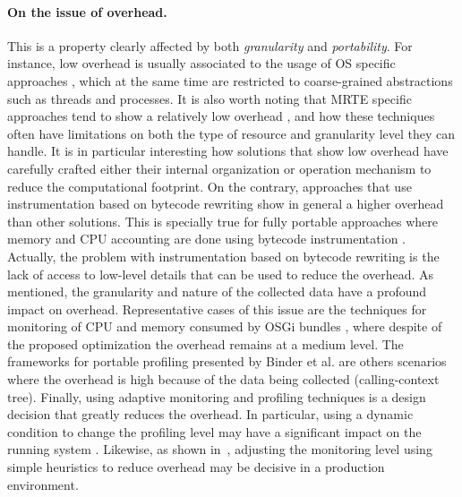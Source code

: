 \paragraph{On the issue of overhead.}
This is a property clearly affected by both \textit{granularity} and \textit{portability}.
For instance, low overhead is usually associated to the usage of OS specific approaches \cite{Banga:1999:RCN:296806.296810, DBLP:conf/pppj/PeternierBBP11, Soltesz:2007:COS:1272998.1273025, Kamp00jails:confining}, which at the same time are restricted to coarse-grained abstractions such as threads and processes.
It is also worth noting that MRTE specific approaches tend to show a relatively low overhead \cite{Price:2003:GCM:829515.830545,dsn/09/geoffray/ijvm, Dmitriev:2004:PJA:974043.974067, citeulike:481405, Attouchi:2014:MMM:2602458.2602467, back_processes_2000, czajkowski_multitasking_2001}, and how these techniques often have limitations on both the type of resource and granularity level they can handle.
It is in particular interesting how solutions that show low overhead have carefully crafted  either their internal organization \cite{back_processes_2000, czajkowski_multitasking_2001} or operation mechanism \cite{Dmitriev:2004:PJA:974043.974067, citeulike:481405} to reduce the computational footprint.
On the contrary, approaches that use instrumentation based on bytecode rewriting show in general a higher overhead than other solutions.
This is specially true for fully portable approaches where memory and CPU accounting are done using bytecode instrumentation \cite{czajkowski_jres:_1998, Hulaas:2004:PTP:1014007.1014024,Hulaas:2008:PTL,binder_portable_2001, Binder200657,Hulaas:2008:PTL}.
Actually, the problem with instrumentation based on bytecode rewriting is the lack of access to low-level details that can be used to reduce the overhead.
As mentioned, the granularity and nature of the collected data have a profound impact on overhead.
Representative cases of this issue are the techniques for monitoring of CPU and memory consumed by OSGi bundles \cite{Maurel:2012:AME:2304736.2304763, Attouchi:2014:MMM:2602458.2602467}, where despite of the proposed optimization the overhead remains at a medium level.
The frameworks for portable profiling presented by Binder et al. \cite{Binder200645, Binder:2009:PPV:1464245.1464249} are others scenarios where the overhead is high because of the data being collected (calling-context tree).
Finally, using adaptive monitoring and profiling techniques is a design decision that greatly reduces the overhead.
In particular, using a dynamic condition to change the profiling level may have a significant impact on the running system \cite{Dmitriev:2004:PJA:974043.974067, citeulike:481405}.
Likewise, as shown in~\cite{Maurel:2012:AME:2304736.2304763}, adjusting the monitoring level using simple heuristics to reduce overhead may be decisive in a production environment.

